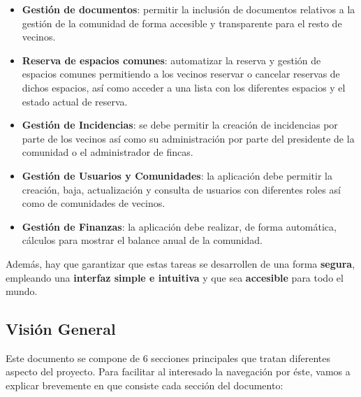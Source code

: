 \begin{itemize}
	\item \textbf{Gestión de documentos}: permitir la inclusión de documentos relativos a la gestión de la comunidad de forma accesible y transparente para el resto de vecinos.
		
	\item \textbf{Reserva de espacios comunes}: automatizar la reserva y gestión de espacios comunes permitiendo a los vecinos reservar o cancelar reservas de dichos espacios, así como acceder a una lista con los diferentes espacios y el estado actual de reserva.
	
	\item \textbf{Gestión de Incidencias}: se debe permitir la creación de incidencias por parte de los vecinos así como su administración por parte del presidente de la comunidad o el administrador de fincas.
	
	\item \textbf{Gestión de Usuarios y Comunidades}: la aplicación debe permitir la creación, baja, actualización y consulta de usuarios con diferentes roles así como de comunidades de vecinos.
	
	\item \textbf{Gestión de Finanzas}: la aplicación debe realizar, de forma automática, cálculos para mostrar el balance anual
	de la comunidad.
\end{itemize}

Además, hay que garantizar que estas tareas se desarrollen de una forma \textbf{segura}, empleando una \textbf{interfaz simple e intuitiva} y que sea \textbf{accesible} para todo el mundo.

\subsection{Visión General}
Este documento se compone de 6 secciones principales que tratan diferentes aspecto del proyecto. Para facilitar al interesado la navegación por éste, vamos a explicar brevemente en que consiste cada sección del documento:

